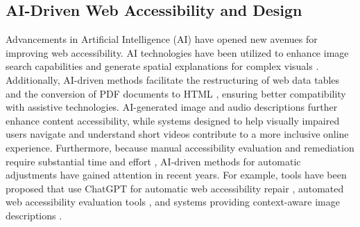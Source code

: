 \begin{comment}
New solutions are also being proposed for challenges specific to online shopping websites. For example, in C2C shopping applications, mobile applications have been developed that apply online AI assistants for information retrieval and communication \cite{10.1145/3604571.3604586}. Additionally, in C2C marketplaces, the need for investigating methods to encourage sellers to provide higher quality and more accessible product descriptions and photos has been pointed out \cite{10.1145/3517428.3550390}. Within this research trend, we are proposing a new approach. Specifically, we are advancing research to automate accessibility design for shopping websites aimed at screen reader users using GenAI. This initiative aims to further develop existing research and comprehensively improve the accessibility of entire websites. Unlike previous research that focused on individual elements (such as images, videos, text, etc.), our research aims to optimize the overall structure and content of shopping websites to achieve a seamless and stress-free shopping experience for screen reader users. It is believed that this automation approach can realize high-quality accessibility design while reducing the burden on developers.
\end{comment}



\subsection{AI-Driven Web Accessibility and Design}
\label{subsecction_2.2}
Advancements in Artificial Intelligence (AI) have opened new avenues for improving web accessibility. AI technologies have been utilized to enhance image search capabilities \cite{jing2015visual, zhai2017visual} and generate spatial explanations for complex visuals \cite{zhong2015regionspeak}. Additionally, AI-driven methods facilitate the restructuring of web data tables \cite{10.1145/3491102.3517469} and the conversion of PDF documents to HTML \cite{10.1145/3441852.3476545, wang2021improving}, ensuring better compatibility with assistive technologies. AI-generated image and audio descriptions \cite{huh2023genassist, lei2020mart, 10.1145/3411764.3445347, 10.1145/3357236.3395433, 10.1145/3334480.3382821} further enhance content accessibility, while systems designed to help visually impaired users navigate and understand short videos \cite{van2024making} contribute to a more inclusive online experience. Furthermore, because manual accessibility evaluation and remediation require substantial time and effort \cite{9809423}, AI-driven methods for automatic adjustments have gained attention in recent years. For example, tools have been proposed that use ChatGPT for automatic web accessibility repair \cite{10.1145/3594806.3596542}, automated web accessibility evaluation tools \cite{10.1145/3650212.3652113}, and systems providing context-aware image descriptions \cite{10.1145/3663548.3675658}.

